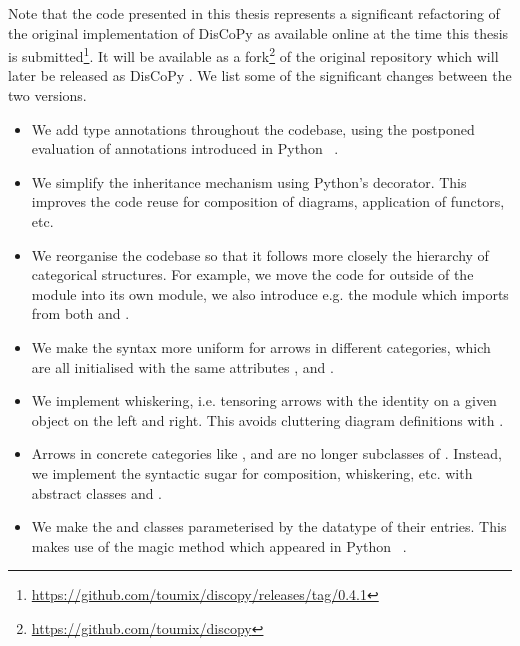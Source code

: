 Note that the code presented in this thesis represents a significant refactoring of the original implementation of DisCoPy  as available online at the time this thesis is submitted\footnote
{\url{https://github.com/toumix/discopy/releases/tag/0.4.1}}.
It will be available as a fork\footnote
{\url{https://github.com/toumix/discopy}} of the original repository which will later be released as DisCoPy .
We list some of the significant changes between the two versions.
\begin{itemize}
\item We add type annotations throughout the codebase, using the postponed evaluation of annotations introduced in Python ~\cite{Langa17}.
\item We simplify the inheritance mechanism using Python's  decorator.
This improves the code reuse for composition of diagrams, application of functors, etc.
\item We reorganise the codebase so that it follows more closely the hierarchy of categorical structures.
For example, we move the code for  outside of the  module into its own  module, we also introduce e.g. the  module which imports from both  and .
\item We make the syntax more uniform for arrows in different categories, which are all initialised with the same attributes ,  and .
\item We implement whiskering, i.e. tensoring arrows with the identity on a given object on the left and right. This avoids cluttering diagram definitions with .
\item Arrows in concrete categories like ,  and  are no longer subclasses of . Instead, we implement the syntactic sugar for composition, whiskering, etc. with abstract classes  and .
\item We make the  and  classes parameterised by the datatype of their entries.
This makes use of the magic method  which appeared in Python ~\cite{Levkivskyi17}.
\end{itemize}
